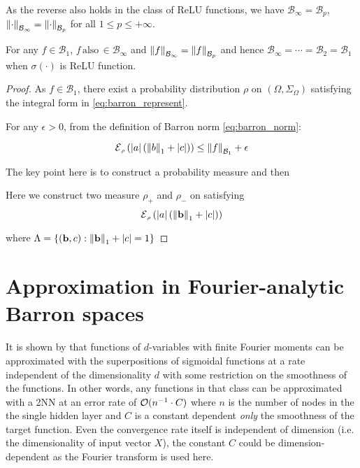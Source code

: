 As the reverse also holds in the class of ReLU functions,  we have
$\mathcal{B}_{\infty} = \mathcal{B}_p$, $\left\| {\cdot} \right\|_{\mathcal{B}_{\infty}} =
    \left\| {\cdot} \right\|_{\mathcal{B}_{p}}$  for all $1 \leq p \leq +\infty$.

\begin{proposition}
    \label{lamma:equivalence_barron_space}

    For any $f \in \mathcal{B}_1$, $f
        \,\text{also}\, \in \mathcal{B}_{\infty}$ and $\left\| {f} \right\|_{\mathcal{B}_{\infty}} =
        \left\| {f} \right\|_{\mathcal{B}_{p}}$ and hence $ \mathcal{B}_{\infty} = \cdots =
        \mathcal{B}_{2} = \mathcal{B}_1$ when $\sigma(\cdot)$ is ReLU function.
\end{proposition}

\begin{proof}
    As $f \in \mathcal{B}_1$,  there exist a probability distribution $\rho$ on
    $(\Omega, \Sigma_\Omega)$ satisfying the integral form in
    \eqref{eq:barron_represent}.

    For any $\epsilon > 0$, from the definition of Barron norm
    \eqref{eq:barron_norm}:

    \begin{equation}
        \ERWi{\rho}{\abs{a}(\norm{b}_1 + \abs{c})} \leq \barronnorm{f}{1} + \epsilon
    \end{equation}


    The key point here is to construct a probability measure and then

    Here we construct two measure $\rho_+$ and $\rho_-$ on satisfying
    \begin{equation*}
        \ERWi{\rho}{\abs{a}(\norm{\mathbf{b}}_1 + \abs{c})}
    \end{equation*}


    where $\Lambda = \{(\mathbf{b}, c): \left\| \mathbf{b} \right\|_1 + \left| c \right| = 1\}$
\end{proof}


\section{Approximation in Fourier-analytic Barron spaces}
\label{sec:spectral_norm}

It is shown by \cite{barronUniversalApproximationBounds1993} that functions of
$d$-variables with finite Fourier moments can be approximated with the
superpositions of sigmoidal functions at a rate independent of the
dimensionality $d$ with some restriction on the smoothness of the functions. In
other words, any functions in that class can be approximated with a 2NN at an
error rate of $\mathcal{O}(n^{-1} \cdot C)$ where $n$ is the number of nodes in the
the single hidden layer and $C$ is a constant dependent \textit{only} the
smoothness of the target function. Even the convergence rate itself is
independent of dimension (i.e. the dimensionality of input vector $X$), the
constant $C$ could be dimension-dependent as the Fourier transform is used here.


